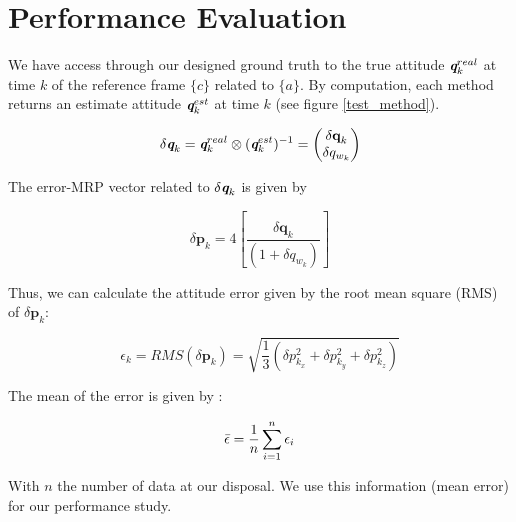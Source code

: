\documentclass[conference]{IEEEtran}
\begin{document}
\section{Performance Evaluation}


We have access through our designed ground truth to the true attitude $\textbf{\em q}^{real}_k$ at time $k$ of the reference frame $\{c\}$ related to $\{a\}$.
By computation, each method returns an estimate attitude $\textbf{\em q}^{est}_k$ at time $k$ (see figure \ref{test_method}). 

\begin{equation}
 \delta \textbf{\em q}_k = \textbf{\em q}^{real}_k \otimes (\textbf{\em q}^{est}_k)^{-1} =  \begin{pmatrix}  \delta \textbf{q}_{k} \\ \delta q_{w_k}  \end{pmatrix}
\end{equation}

The error-MRP vector related to $ \delta \textbf{\em q}_k$ is given by

\begin{equation}
 \delta \textbf{p}_k  = 4[\frac{\delta \textbf{q}_{k}  }{(1+\delta q_{w_k})}]
\end{equation}


Thus, we can calculate the attitude error given by the root mean square (RMS) of $\delta \textbf{p}_k$:

\begin{equation}
\epsilon_k  = RMS (\delta \textbf{p}_k) = \sqrt{\frac{1}{3}( \delta p_{k_x}^2 +\delta p_{k_y}^2+\delta p_{k_z}^2)  }
\label{error_definition}
\end{equation}

The mean of the error is given by :

\begin{equation}
\bar{\epsilon}  = \frac{1}{n}\sum_{i=1}^n \epsilon_i \\
\label{mean_var_error_def}
\end{equation}

With $n$ the number of data at our disposal. We use this information (mean error) for our performance study. 
\end{document}
